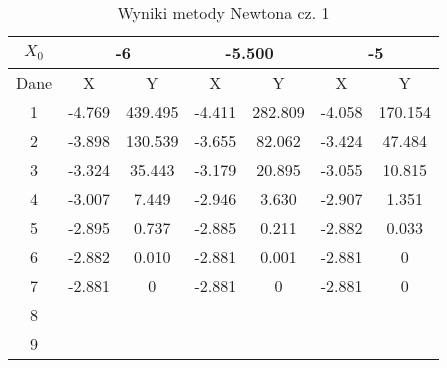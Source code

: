 \documentclass[a4paper, 11pt]{article}
\begin{document}
\begin{enumerate}
\begin{itemize}
\begin{table}[h]                                                    
\centering                                                       
\begin{tabular}{|c|c|c|c|c|c|c|}                                 
\hline                                                           
\( X_0 \) & \multicolumn{2}{c|}{-6 } & \multicolumn{2}{c|}{-5.500 } & \multicolumn{2}{c|}{-5 } \\     
\hline                                                           
Dane & X & Y & X & Y & X & Y \\                                 
\hline                                                           
1  & -4.769 & 439.495 & -4.411 & 282.809 & -4.058 & 170.154 \\
\hline                                                           
2  & -3.898 & 130.539 & -3.655 & 82.062 & -3.424 & 47.484 \\  
\hline                                                           
3  & -3.324 & 35.443 & -3.179 & 20.895 & -3.055 & 10.815 \\   
\hline                                                           
4  & -3.007 & 7.449 & -2.946 & 3.630 & -2.907 & 1.351 \\      
\hline                                                           
5  & -2.895 & 0.737 & -2.885 & 0.211 & -2.882 & 0.033 \\      
\hline                                                           
6  & -2.882 & 0.010 & -2.881 & 0.001 & -2.881 & 0 \\      
\hline                                                           
7  & -2.881 & 0  & -2.881 & 0 & -2.881 & 0 \\      
\hline                                                           
8  &  &  &  &  &  &  \\         
\hline                                                           
9  &  &  &  &  &  &  \\         
\hline                                                           
\end{tabular}                                                    
\caption{Wyniki metody Newtona cz. 1}                            
\label{table:Wyniki metody Newtona cz. 1}                        
\end{table}                                                      
\begin{table}[p]                                                 
\centering                                                    
\begin{tabular}{|c|c|c|c|c|c|c|}                              
\hline                                                        


\end{tabular}
\end{table}
\end{itemize}
\end{enumerate}
\end{document}
